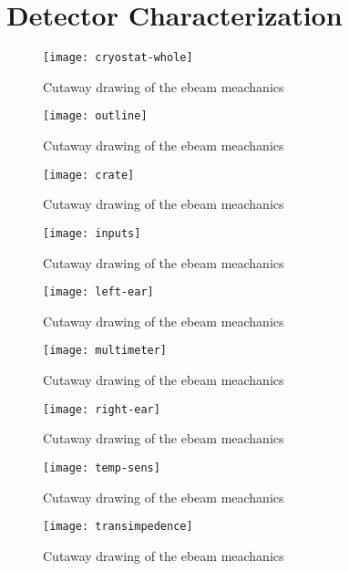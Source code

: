 \chapter{Detector Characterization}

\begin{figure}[htpb]
\centering
\texttt{[image: cryostat-whole]}
\caption{Cutaway drawing of the ebeam meachanics}
\label{fig:cryostat-whole}
\end{figure}

\begin{figure}[htpb]
\centering
\texttt{[image: outline]}
\caption{Cutaway drawing of the ebeam meachanics}
\label{fig:outline}
\end{figure}

\begin{figure}[htpb]
\centering
\texttt{[image: crate]}
\caption{Cutaway drawing of the ebeam meachanics}
\label{fig:crate}
\end{figure}

\begin{figure}[htpb]
\centering
\texttt{[image: inputs]}
\caption{Cutaway drawing of the ebeam meachanics}
\label{fig:inputs}
\end{figure}

\begin{figure}[htpb]
\centering
\texttt{[image: left-ear]}
\caption{Cutaway drawing of the ebeam meachanics}
\label{fig:left-ear}
\end{figure}

\begin{figure}[htpb]
\centering
\texttt{[image: multimeter]}
\caption{Cutaway drawing of the ebeam meachanics}
\label{fig:multimeter}
\end{figure}

\begin{figure}[htpb]
\centering
\texttt{[image: right-ear]}
\caption{Cutaway drawing of the ebeam meachanics}
\label{fig:right-ear}
\end{figure}

\begin{figure}[htpb]
\centering
\texttt{[image: temp-sens]}
\caption{Cutaway drawing of the ebeam meachanics}
\label{fig:temp-sens}
\end{figure}

\begin{figure}[htpb]
\centering
\texttt{[image: transimpedence]}
\caption{Cutaway drawing of the ebeam meachanics}
\label{fig:transimpedence}
\end{figure}
